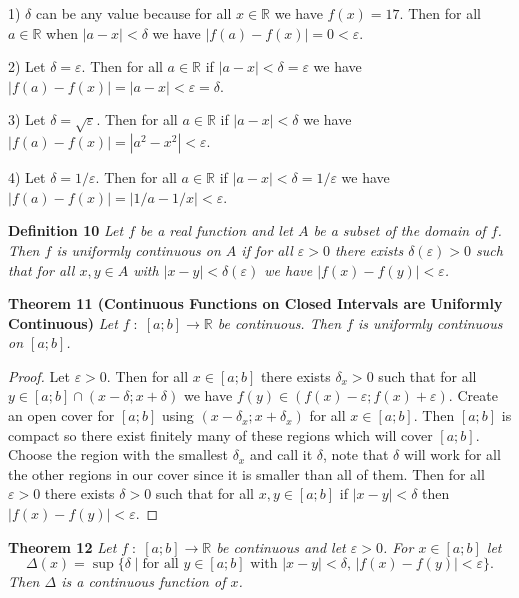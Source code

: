 \documentclass{article}
\begin{document}
\begin{flushleft}
1) $\delta$ can be any value because for all $x \in \mathbb{R}$ we have $f(x)=17$. Then for all $a \in \mathbb{R}$ when $|a-x| < \delta$ we have $|f(a)-f(x)|=0<\varepsilon$.\newline

2) Let $\delta=\varepsilon$. Then for all $a \in \mathbb{R}$ if $|a-x| < \delta = \varepsilon$ we have $|f(a) - f(x)| = |a-x| < \varepsilon = \delta$.\newline

3) Let $\delta=\sqrt{\varepsilon}$. Then for all $a \in \mathbb{R}$ if $|a-x| < \delta$ we have $|f(a)-f(x)| = |a^2-x^2| < \varepsilon$.\newline

4) Let $\delta=1/\varepsilon$. Then for all $a \in \mathbb{R}$ if $|a-x| < \delta=1/\varepsilon$ we have $|f(a)-f(x)| = |1/a - 1/x| < \varepsilon$.\newline

\textbf{Definition 10}
\textsl{Let $f$ be a real function and let $A$ be a subset of the domain of $f$. Then $f$ is uniformly continuous on $A$ if for all $\varepsilon > 0$ there exists $\delta(\varepsilon)>0$ such that for all $x,y \in A$ with $|x-y| < \delta(\varepsilon)$ we have $|f(x) - f(y)| < \varepsilon$.}\newline

\textbf{Theorem 11 (Continuous Functions on Closed Intervals are Uniformly Continuous)}
\textsl{Let $f \; : \; [a;b] \rightarrow \mathbb{R}$ be continuous. Then $f$ is uniformly continuous on $[a;b]$.}
\begin{proof}
Let $\varepsilon > 0$. Then for all $x \in [a;b]$ there exists $\delta_x > 0$ such that for all $y \in [a;b] \cap (x - \delta ; x + \delta)$ we have $f(y) \in (f(x) - \varepsilon ; f(x) + \varepsilon)$. Create an open cover for $[a;b]$ using $(x - \delta_x ; x + \delta_x)$ for all $x \in [a;b]$. Then $[a;b]$ is compact so there exist finitely many of these regions which will cover $[a;b]$. Choose the region with the smallest $\delta_x$ and call it $\delta$, note that $\delta$ will work for all the other regions in our cover since it is smaller than all of them. Then for all $\varepsilon > 0$ there exists $\delta > 0$ such that for all $x,y \in [a;b]$ if $|x-y| < \delta$ then $|f(x)-f(y)| < \varepsilon$.
\end{proof}

\textbf{Theorem 12}
\textsl{Let $f \; : \; [a;b] \rightarrow \mathbb{R}$ be continuous and let $\varepsilon > 0$. For $x \in [a;b]$ let
\[
\Delta(x) = \sup \{\delta \mid \text{for all $y \in [a;b]$ with $|x-y| < \delta$, $|f(x)-f(y)| < \varepsilon$}\}.
\]
Then $\Delta$ is a continuous function of $x$.}

\end{flushleft}
\end{document}
